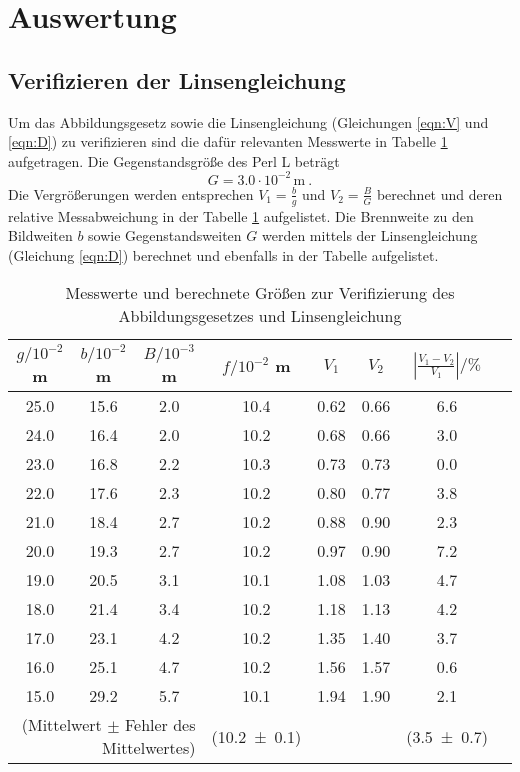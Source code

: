 \section{Auswertung}
\label{sec:Auswertung}
\subsection{Verifizieren der Linsengleichung}
Um das Abbildungsgesetz sowie die Linsengleichung (Gleichungen \eqref{eqn:V} und \eqref{eqn:D}) zu verifizieren sind die dafür relevanten Messwerte in Tabelle \ref{tab:VdA} aufgetragen. Die Gegenstandsgröße des Perl L beträgt
\begin{equation}
  G = 3.0 \cdot 10^{-2} \, \text{m} \ .
\end{equation}
Die Vergrößerungen werden entsprechen $V_1 = \frac{b}{g}$ und $V_2 = \frac{B}{G}$ berechnet und deren relative Messabweichung in der Tabelle \ref{tab:VdA} aufgelistet. Die Brennweite zu den Bildweiten $b$ sowie Gegenstandsweiten $G$ werden mittels der Linsengleichung (Gleichung \eqref{eqn:D}) berechnet und ebenfalls in der Tabelle aufgelistet.
\begin{table}
  \centering
  \begin{tabular}{c c c | c | c c c c}
    \toprule
    $g / 10^{-2}$ m & $b / 10^{-2}$ m & $B / 10^{-3}$ m & $f / 10^{-2}$ m & $V_1$ & $V_2$ & $\left\lvert \frac{V_1 - V_2}{V_1} \right\rvert / \% $\\
   \midrule
    25.0 & 15.6 & 2.0 & 10.4 & 0.62   & 0.66	& 6.6 	\\
    24.0 & 16.4 & 2.0 & 10.2 & 0.68   & 0.66	& 3.0	\\
    23.0 & 16.8 & 2.2 & 10.3 & 0.73   & 0.73	& 0.0	\\
    22.0 & 17.6 & 2.3 & 10.2 & 0.80   & 0.77	& 3.8	\\
    21.0 & 18.4 & 2.7 & 10.2 & 0.88   & 0.90	& 2.3	\\
    20.0 & 19.3 & 2.7 & 10.2 & 0.97   & 0.90	& 7.2	\\
    19.0 & 20.5 & 3.1 & 10.1 & 1.08   & 1.03	& 4.7	\\
    18.0 & 21.4 & 3.4 & 10.2 & 1.18   & 1.13	& 4.2	\\
    17.0 & 23.1 & 4.2 & 10.2 & 1.35   & 1.40	& 3.7	\\
    16.0 & 25.1 & 4.7 & 10.2 & 1.56   & 1.57	& 0.6	\\
    15.0 & 29.2 & 5.7 & 10.1 & 1.94   & 1.90	& 2.1	\\
    \midrule
    \multicolumn{3}{r|}{(Mittelwert $\pm$ Fehler des Mittelwertes)}&(\num {10.2 +- 0.1}) & & & (\num{3.5 +- 0.7})\\
    \bottomrule
  \end{tabular}
  \caption{Messwerte und berechnete Größen zur Verifizierung des Abbildungsgesetzes und Linsengleichung}
  \label{tab:VdA}
\end{table}
